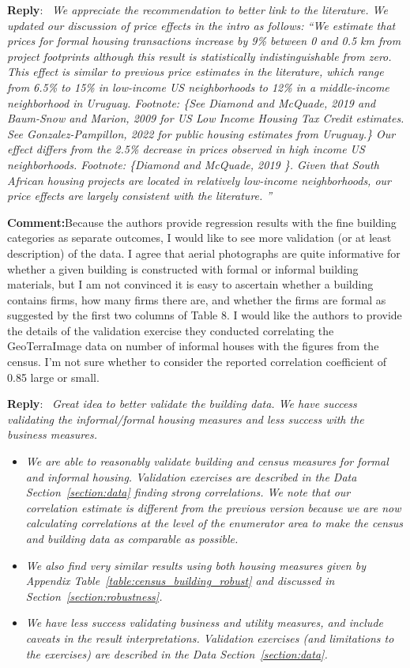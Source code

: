\documentclass{article}
\newcommand{\reply}{\medskip \noindent \textbf{Reply}:\ \textit }
\newcommand{\sr}{\begin{minipage}{\dimexpr\textwidth-3cm}}
\newcommand{\er}{\end{minipage}}
\newcommand{\cc}{\medskip \noindent \textbf{Comment:}\hspace{2em}}
\begin{document}
\sr
\reply{ We appreciate the recommendation to better link to the literature.  We updated our discussion of price effects in the intro as follows: ``We estimate that prices for formal housing transactions increase by 9\% between 0 and 0.5 km from project footprints although this result is statistically indistinguishable from zero.  This effect is similar to previous price estimates in the literature, which range from 6.5\% to 15\% in low-income US neighborhoods to 12\% in a middle-income neighborhood in Uruguay. Footnote: \{See Diamond and McQuade, 2019 and  Baum-Snow and Marion, 2009 for US Low Income Housing Tax Credit estimates.  See Gonzalez-Pampillon, 2022 for public housing estimates from Uruguay.\}  Our effect differs from the 2.5\% decrease in prices observed in high income US neighborhoods. Footnote: \{Diamond and McQuade, 2019 \}.  Given that South African housing projects are located in relatively low-income neighborhoods, our price effects are largely consistent with the literature. '' }\\
\er

\cc Because the authors provide regression results with the fine building categories as separate outcomes, I would like to see more validation (or at least description) of the data. I agree that aerial photographs are quite informative for whether a given building is constructed with formal or informal building materials, but I am not convinced it is easy to ascertain whether a building contains firms, how many firms there are, and whether the firms are formal as suggested by the first two columns of Table 8. I would like the authors to provide the details of the validation exercise they conducted correlating the GeoTerraImage data on number of informal houses with the figures from the census. I'm not sure whether to consider the reported correlation coefficient of 0.85 large or small. 

\sr
\reply{ Great idea to better validate the building data.  We have success validating the informal/formal housing measures and less success with the business measures. }
\begin{itemize}
\item \textit{ We are able to reasonably validate building and census measures for formal and informal housing.  Validation exercises are described in the Data Section~\ref{section:data} finding strong correlations.   We note that our correlation estimate is different from the previous version because we are now calculating correlations at the level of the enumerator area to make the census and building data as comparable as possible.  }
\item \textit{We also find very similar results using both housing measures given by Appendix Table~\ref{table:census_building_robust} and discussed in Section~\ref{section:robustness}.}
\item \textit{ We have less success validating business and utility measures, and include caveats in the result interpretations. Validation exercises (and limitations to the exercises) are described in the Data Section~\ref{section:data}.} 
\end{itemize} 
\er\\
\end{document}
